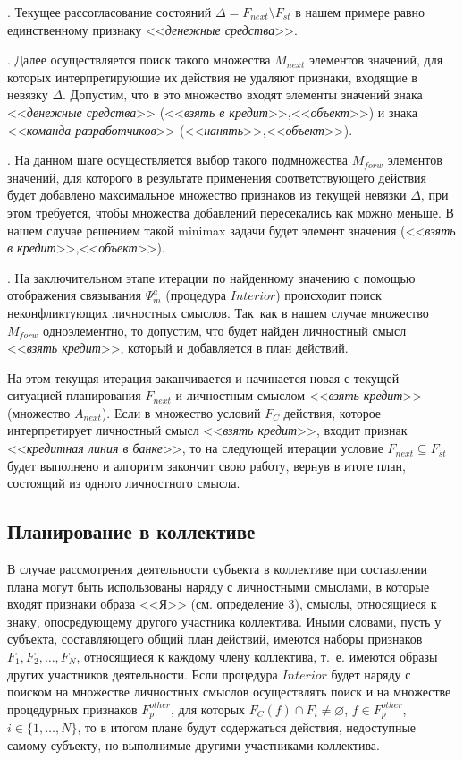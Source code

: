 \documentclass[a4paper, 12pt]{article}
\numberwithin{equation}{section}
\begin{document}
	. Текущее рассогласование состояний $\Delta=F_{next}\setminus F_{st}$ в нашем примере равно единственному признаку <<\textit{денежные средства}>>.
	
	. Далее осуществляется поиск такого множества $M_{next}$ элементов значений, для которых интерпретирующие их действия не удаляют признаки, входящие в невязку $\Delta$. Допустим, что в это множество входят элементы значений знака <<\textit{денежные средства}>> (<<\textit{взять в кредит}>>,<<\textit{объект}>>) и знака <<\textit{команда разработчиков}>> (<<\textit{нанять}>>,<<\textit{объект}>>).
	
	. На данном шаге осуществляется выбор такого подмножества $M_{forw}$ элементов значений, для которого в результате применения соответствующего действия будет добавлено максимальное множество признаков из текущей невязки $\Delta$, при этом требуется, чтобы множества добавлений пересекались как можно меньше. В нашем случае решением такой minimax задачи будет элемент значения (<<\textit{взять в кредит}>>,<<\textit{объект}>>).
	
	. На заключительном этапе итерации по найденному значению с помощью отображения связывания $\Psi_m^a$ (процедура $Interior$) происходит поиск неконфликтующих личностных смыслов. Так~как в нашем случае множество $M_{forw}$ одноэлементно, то допустим, что будет найден личностный смысл <<\textit{взять кредит}>>, который и добавляется в план действий.
	
	На этом текущая итерация заканчивается и начинается новая с текущей ситуацией планирования $F_{next}$ и личностным смыслом <<\textit{взять кредит}>> (множество $A_{next}$). Если в множество условий $F_C$ действия, которое интерпретирует личностный смысл <<\textit{взять кредит}>>, входит признак <<\textit{кредитная линия в банке}>>, то на следующей итерации условие $F_{next}\subseteq F_{st}$ будет выполнено и алгоритм закончит свою работу, вернув в итоге план, состоящий из одного личностного смысла.
	
	\subsection{Планирование в коллективе} В случае рассмотрения деятельности субъекта в коллективе при составлении плана могут быть использованы наряду с личностными смыслами, в которые входят признаки образа <<Я>> (см. определение 3), смыслы, относящиеся к знаку, опосредующему другого участника коллектива. Иными словами, пусть у субъекта, составляющего общий план действий, имеются наборы признаков $F_1,F_2,\dots,F_N$, относящиеся к каждому члену коллектива, т.~е. имеются образы других участников деятельности. Если процедура $Interior$ будет наряду с поиском на множестве личностных смыслов осуществлять поиск и на множестве процедурных признаков $F_p^{other}$, для которых $F_C(f)\cap F_i\not = \varnothing$, $f\in F_p^{other}$, $i\in\{1,\dots,N\}$, то в итогом плане будут содержаться действия, недоступные самому субъекту, но выполнимые другими участниками коллектива.
	
\end{document}
